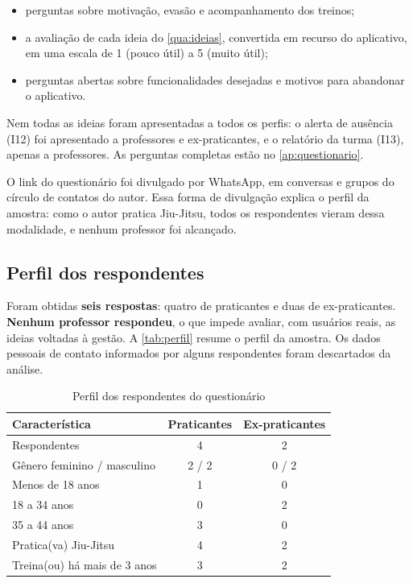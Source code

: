 \begin{itemize}
  \item perguntas sobre motivação, evasão e acompanhamento dos treinos;
  \item a avaliação de cada ideia do \autoref{qua:ideias}, convertida em
        recurso do aplicativo, em uma escala de 1 (pouco útil) a 5 (muito
        útil);
  \item perguntas abertas sobre funcionalidades desejadas e motivos para
        abandonar o aplicativo.
\end{itemize}

Nem todas as ideias foram apresentadas a todos os perfis: o alerta de
ausência (I12) foi apresentado a professores e ex-praticantes, e o
relatório da turma (I13), apenas a professores. As perguntas completas
estão no \autoref{ap:questionario}.

O link do questionário foi divulgado por WhatsApp, em conversas e grupos
do círculo de contatos do autor. Essa forma de divulgação explica o perfil
da amostra: como o autor pratica Jiu-Jitsu, todos os respondentes vieram
dessa modalidade, e nenhum professor foi alcançado.

\subsection{Perfil dos respondentes}

Foram obtidas \textbf{seis respostas}: quatro de praticantes e duas de
ex-praticantes. \textbf{Nenhum professor respondeu}, o que impede avaliar,
com usuários reais, as ideias voltadas à gestão. A \autoref{tab:perfil}
resume o perfil da amostra. Os dados pessoais de contato informados por
alguns respondentes foram descartados da análise.

\begin{table}[!htb]
  \centering
  \caption{Perfil dos respondentes do questionário}
  \label{tab:perfil}
  \footnotesize
  \begin{tabular}{lcc}
    \toprule
    \textbf{Característica} & \textbf{Praticantes} & \textbf{Ex-praticantes} \\
    \midrule
    Respondentes                    & 4 & 2 \\
    Gênero feminino / masculino     & 2 / 2 & 0 / 2 \\
    Menos de 18 anos                & 1 & 0 \\
    18 a 34 anos                    & 0 & 2 \\
    35 a 44 anos                    & 3 & 0 \\
    Pratica(va) Jiu-Jitsu           & 4 & 2 \\
    Treina(ou) há mais de 3 anos    & 3 & 2 \\
    \bottomrule
  \end{tabular}
\end{table}

